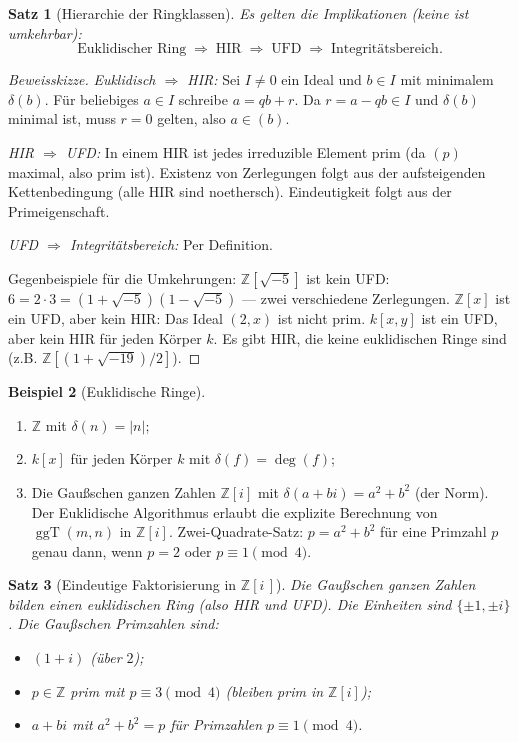\documentclass[12pt,a4paper]{amsart}
\newtheorem{theorem}{Satz}[section]
\theoremstyle{definition}
\newtheorem{example}[theorem]{Beispiel}
\theoremstyle{definition}
\newcommand{\ggT}{\operatorname{ggT}}
\begin{document}
\begin{theorem}[Hierarchie der Ringklassen]\label{satz:hierarchie}
Es gelten die Implikationen (keine ist umkehrbar):
\[
  \text{Euklidischer Ring} \;\Rightarrow\; \text{HIR} \;\Rightarrow\; \text{UFD}
  \;\Rightarrow\; \text{Integritätsbereich}.
\]
\end{theorem}

\begin{proof}[Beweissk{}izze]
\textit{Euklidisch $\Rightarrow$ HIR:} Sei $I \neq 0$ ein Ideal und $b \in I$ mit
minimalem $\delta(b)$. Für beliebiges $a \in I$ schreibe $a = qb + r$. Da $r = a - qb
\in I$ und $\delta(b)$ minimal ist, muss $r = 0$ gelten, also $a \in (b)$.

\textit{HIR $\Rightarrow$ UFD:} In einem HIR ist jedes irreduzible Element prim
(da $(p)$ maximal, also prim ist). Existenz von Zerlegungen folgt aus der aufsteigenden
Kettenbedingung (alle HIR sind noethersch). Eindeutigkeit folgt aus der Primeigenschaft.

\textit{UFD $\Rightarrow$ Integritätsbereich:} Per Definition.

Gegenbeispiele für die Umkehrungen: $\mathbb{Z}[\sqrt{-5}]$ ist kein UFD:
$6 = 2 \cdot 3 = (1+\sqrt{-5})(1-\sqrt{-5})$ --- zwei verschiedene Zerlegungen.
$\mathbb{Z}[x]$ ist ein UFD, aber kein HIR: Das Ideal $(2,x)$ ist nicht prim.
$k[x,y]$ ist ein UFD, aber kein HIR für jeden Körper $k$.
Es gibt HIR, die keine euklidischen Ringe sind (z.B. $\mathbb{Z}[(1+\sqrt{-19})/2]$).
\end{proof}

\begin{example}[Euklidische Ringe]
\begin{enumerate}[label=(\alph*)]
  \item $\mathbb{Z}$ mit $\delta(n) = |n|$;
  \item $k[x]$ für jeden Körper $k$ mit $\delta(f) = \deg(f)$;
  \item Die Gaußschen ganzen Zahlen $\mathbb{Z}[i]$ mit $\delta(a+bi) = a^2 + b^2$
        (der Norm). Der Euklidische Algorithmus erlaubt die explizite Berechnung von
        $\ggT(m,n)$ in $\mathbb{Z}[i]$.
        Zwei-Quadrate-Satz: $p = a^2 + b^2$ für eine Primzahl $p$ genau dann, wenn
        $p = 2$ oder $p \equiv 1 \pmod 4$.
\end{enumerate}
\end{example}

\begin{theorem}[Eindeutige Faktorisierung in {$\mathbb{Z}[i\,]$}]
Die Gaußschen ganzen Zahlen bilden einen euklidischen Ring (also HIR und UFD).
Die Einheiten sind $\{\pm 1, \pm i\}$. Die Gaußschen Primzahlen sind:
\begin{itemize}
  \item $(1+i)$ (über $2$);
  \item $p \in \mathbb{Z}$ prim mit $p \equiv 3 \pmod 4$ (bleiben prim in $\mathbb{Z}[i]$);
  \item $a + bi$ mit $a^2 + b^2 = p$ für Primzahlen $p \equiv 1 \pmod 4$.
\end{itemize}
\end{theorem}
\end{document}
